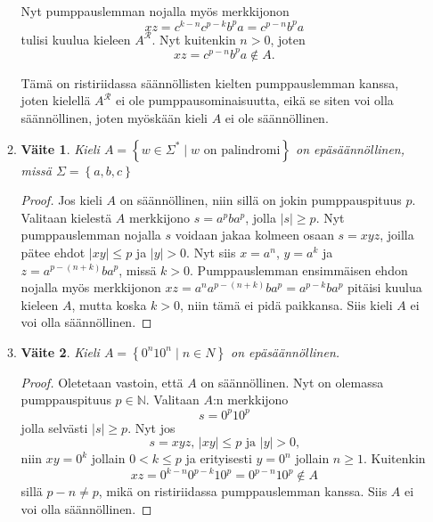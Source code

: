 \documentclass[a4paper,11pt]{article}
\newtheorem*{claim}{Väite}
\newcommand{\set}[1]{{\left\{ #1 \right\}}}
\newcommand{\Nat}{\mathbb{N}}
\begin{document}
\begin{enumerate}
\begin{enumerate}
    Nyt pumppauslemman nojalla myös merkkijonon
    \begin{equation*}
      xz = c^{k-n}c^{p-k}b^pa = c^{p-n}b^pa
    \end{equation*}
    tulisi kuulua kieleen $A^\mathcal{R}$. Nyt kuitenkin $n > 0$, joten
    \begin{equation*}
      xz = c^{p-n}b^pa \notin A.
    \end{equation*}

    Tämä on ristiriidassa säännöllisten kielten pumppauslemman kanssa, joten
    kielellä $A^\mathcal{R}$ ei ole pumppausominaisuutta, eikä se siten voi olla
    säännöllinen, joten myöskään kieli $A$ ei ole säännöllinen.

  \item
      \begin{claim}
          Kieli $A = \set{w \in \Sigma^* \mid w \text{ on palindromi}}$ on
          epäsäännöllinen, missä $\Sigma = \set{a,b,c}$
      \end{claim}
      \begin{proof}
          Jos kieli $A$ on säännöllinen, niin sillä on jokin pumppauspituus
          $p$. Valitaan kielestä $A$ merkkijono $s = a^pba^p$, jolla $|s| \geq
          p$. Nyt pumppauslemman nojalla $s$ voidaan jakaa kolmeen osaan $s =
          xyz$, joilla pätee ehdot $|xy| \leq p$ ja $|y| > 0$. Nyt siis $x =
          a^n$, $y = a^k$ ja $z = a^{p-(n+k)}ba^p$, missä $k > 0$.
          Pumppauslemman ensimmäisen ehdon nojalla myös merkkijonon $xz =
          a^na^{p-(n+k)}ba^p = a^{p-k}ba^p$ pitäisi kuulua kieleen $A$, mutta
          koska $k > 0$, niin tämä ei pidä paikkansa. Siis kieli $A$ ei voi
          olla säännöllinen.
      \end{proof}


  \item
    \begin{claim}
      Kieli $A = \set{0^n10^n\mid n\in N}$ on epäsäännöllinen.
    \end{claim}
    \begin{proof}
      Oletetaan vastoin, että $A$ on säännöllinen. Nyt on olemassa
      pumppauspituus $p \in \Nat$. Valitaan $A$:n merkkijono
      \begin{equation*}
        s = 0^p10^p
      \end{equation*}
      jolla selvästi $|s| \ge p$. Nyt jos
      \begin{equation*}
        s = xyz \text{, } |xy| \le p \text{ ja }|y| > 0 \text{,}
      \end{equation*}
      niin $xy = 0^k$ jollain $0 < k \le p$ ja erityisesti $y = 0^n$
      jollain $n \ge 1$. Kuitenkin
      \begin{equation*}
        xz = 0^{k-n}0^{p-k}10^p = 0^{p-n}10^p \notin A
      \end{equation*}
      sillä $p - n \neq p$, mikä on ristiriidassa pumppauslemman kanssa.
      Siis $A$ ei voi olla säännöllinen.
    \end{proof}
  \end{enumerate}


\end{enumerate}
\end{document}

